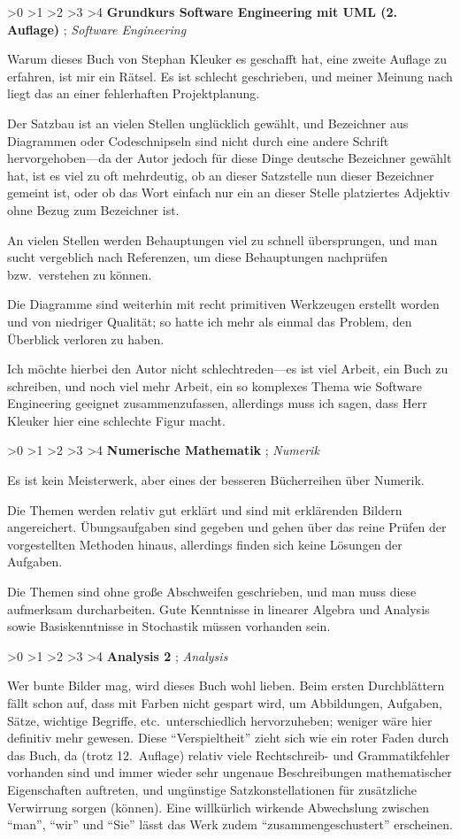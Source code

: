 \documentclass[english,ngerman,fontsize=9pt,intoc,index=totoc,refpage,listof=totoc,draft]{scrbook}
\numberwithin{equation}{section}
\newcommand{\ratingstar}{{\footnotesize \FiveStarShadow}}
\newcommand{\rating}[4]{\noindent\begin{flushright}
  \null\hfilneg%
  \ifnum #1>0 \ratingstar \fi
  \ifnum #1>1 \ratingstar \fi
  \ifnum #1>2 \ratingstar \fi
  \ifnum #1>3 \ratingstar \fi
  \ifnum #1>4 \ratingstar \fi
  \hspace{0.6667em}
  \textbf{\sffamily #2 \hfil\mbox{}}%
  \hspace{0.6667em}
  \cite{#3}; \emph{#4}
\end{flushright}}
\begin{document}
\rating{1}{Grundkurs Software Engineering mit UML (2. Auflage)}
{Kleuker11}
{Software Engineering}

Warum dieses Buch von Stephan Kleuker es geschafft hat, eine zweite Auflage zu erfahren, ist mir ein Rätsel.
Es ist schlecht geschrieben, und meiner Meinung nach liegt das an einer fehlerhaften Projektplanung.

Der Satzbau ist an vielen Stellen unglücklich gewählt, und Bezeichner aus Diagrammen oder Codeschnipseln sind nicht durch eine andere Schrift hervorgehoben---da der Autor jedoch für diese Dinge deutsche Bezeichner gewählt hat, ist es viel zu oft mehrdeutig, ob an dieser Satzstelle nun dieser Bezeichner gemeint ist, oder ob das Wort einfach nur ein an dieser Stelle platziertes Adjektiv ohne Bezug zum Bezeichner ist.

An vielen Stellen werden Behauptungen viel zu schnell übersprungen, und man sucht vergeblich nach Referenzen, um diese Behauptungen nachprüfen bzw.~verstehen zu können.

Die Diagramme sind weiterhin mit recht primitiven Werkzeugen erstellt worden und von niedriger Qualität; so hatte ich mehr als einmal das Problem, den Überblick verloren zu haben.

Ich möchte hierbei den Autor nicht schlechtreden---es ist viel Arbeit, ein Buch zu schreiben, und noch viel mehr Arbeit, ein so komplexes Thema wie Software Engineering geeignet zusammenzufassen, allerdings muss ich sagen, dass Herr Kleuker hier eine schlechte Figur macht.


\rating{4}{Numerische Mathematik}
{deGruyter1,deGruyter2}
{Numerik}

Es ist kein Meisterwerk, aber eines der besseren Bücherreihen über Numerik.

Die Themen werden relativ gut erklärt und sind mit erklärenden Bildern angereichert.
Übungsaufgaben sind gegeben und gehen über das reine Prüfen der vorgestellten Methoden hinaus, allerdings finden sich keine Lösungen der Aufgaben.

Die Themen sind ohne große Abschweifen geschrieben, und man muss diese aufmerksam durcharbeiten.
Gute Kenntnisse in linearer Algebra und Analysis sowie Basiskenntnisse in Stochastik müssen vorhanden sein.


\rating{3}{Analysis 2}
{Analysis2}
{Analysis}

Wer bunte Bilder mag, wird dieses Buch wohl lieben.
Beim ersten Durchblättern fällt schon auf, dass mit Farben nicht gespart wird, um Abbildungen, Aufgaben, Sätze, wichtige Begriffe, etc.~unterschiedlich hervorzuheben; weniger wäre hier definitiv mehr gewesen.
Diese \enquote{Verspieltheit} zieht sich wie ein roter Faden durch das Buch, da (trotz 12.~Auflage) relativ viele Rechtschreib- und Grammatikfehler vorhanden sind und immer wieder sehr ungenaue Beschreibungen mathematischer Eigenschaften auftreten, und ungünstige Satzkonstellationen für zusätzliche Verwirrung sorgen (können).
Eine willkürlich wirkende Abwechslung zwischen \enquote{man}, \enquote{wir} und \enquote{Sie} lässt das Werk zudem \enquote{zusammengeschustert} erscheinen.
\end{document}
